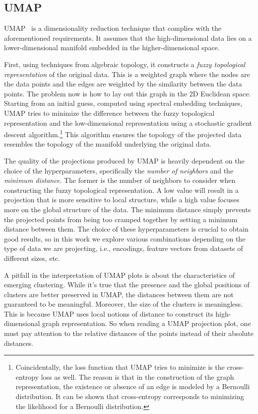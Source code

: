 \subsection{UMAP}
\label{subsec:projections-umap}

UMAP~\cite{UmapUniformMMcinne2018} is a dimensionality reduction technique that complies with the aforementioned requirements. It assumes that the high-dimensional data lies on a lower-dimensional manifold embedded in the higher-dimensional space.

First, using techniques from algebraic topology, it constructs a \emph{fuzzy topological representation} of the original data. This is a weighted graph where the nodes are the data points and the edges are weighted by the similarity between the data points.
The problem now is how to lay out this graph in the 2D Euclidean space. Starting from an initial guess, computed using spectral embedding techniques, UMAP tries to minimize the difference between the fuzzy topological representation and the low-dimensional representation using a stochastic gradient descent algorithm.\footnote{Coincidentally, the loss function that UMAP tries to minimize is the cross-entropy loss as well. The reason is that in the construction of the graph representation, the existence or absence of an edge is modeled by a Bernoulli distribution. It can be shown that cross-entropy corresponds to minimizing the likelihood for a Bernoulli distribution.} This algorithm ensures the topology of the projected data resembles the topology of the manifold underlying the original data.

The quality of the projections produced by UMAP is heavily dependent on the choice of the hyperparameters, specifically the \emph{number of neighbors} and the \emph{minimum distance}. The former is the number of neighbors to consider when constructing the fuzzy topological representation. A low value will result in a projection that is more sensitive to local structure, while a high value focuses more on the global structure of the data. The minimum distance simply prevents the projected points from being too cramped together by setting a minimum distance between them. The choice of these hyperparameters is crucial to obtain good results, so in this work we explore various combinations depending on the type of data we are projecting, i.e., encodings, feature vectors from datasets of different sizes, etc.

A pitfall in the interpretation of UMAP plots is about the characteristics of emerging clustering. While it's true that the presence and the global positions of clusters are better preserved in UMAP, the distances between them are not guaranteed to be meaningful. Moreover, the size of the clusters is meaningless. This is because UMAP uses local notions of distance to construct its high-dimensional graph representation. So when reading a UMAP projection plot, one must pay attention to the relative distances of the points instead of their absolute distances.

